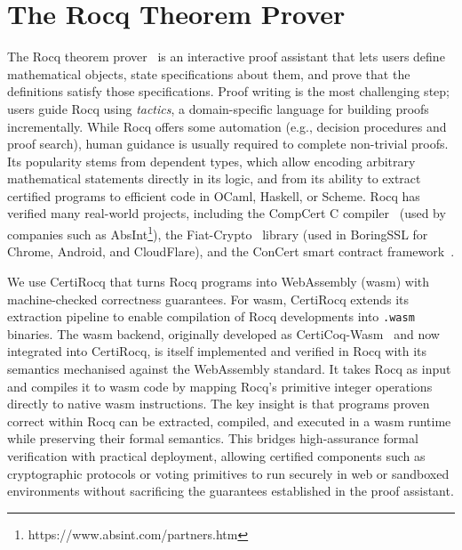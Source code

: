 \section{The Rocq Theorem Prover}\label{coq_theorem}
The Rocq theorem prover~\cite{the_coq_development_team} is an interactive proof assistant that lets users define mathematical objects, state specifications about them, and prove that the definitions satisfy those specifications. Proof writing is the most challenging step; users guide Rocq using \emph{tactics}, a domain-specific language for building proofs incrementally. While Rocq offers some automation (e.g., decision procedures and proof search), human guidance is usually required to complete non-trivial proofs. Its popularity stems from dependent types, which allow encoding arbitrary mathematical statements directly in its logic, and from its ability to extract certified programs to efficient code in OCaml, Haskell, or Scheme.  Rocq has verified many real-world projects, including the CompCert C compiler~\cite{10.1145/1111037.1111042} (used by companies such as AbsInt\footnote{https://www.absint.com/partners.htm}), the Fiat-Crypto~\cite{8835346} library (used in BoringSSL for Chrome, Android, and CloudFlare), and the ConCert smart contract framework~\cite{10.1145/3372885.3373829}.

We use CertiRocq \cite{anand2017certicoq} that turns Rocq programs into WebAssembly (wasm) with machine-checked correctness guarantees. For wasm, CertiRocq extends its extraction pipeline to enable compilation of Rocq developments into \texttt{.wasm} binaries. The wasm backend, originally developed as CertiCoq-Wasm~\cite{meier2025certicoq} and now integrated into CertiRocq, is itself implemented and verified in Rocq with its semantics mechanised against the WebAssembly standard. It takes Rocq as input and compiles it to wasm code by mapping Rocq's primitive integer operations directly to native wasm instructions. The key insight is that programs proven correct within Rocq can be extracted, compiled, and executed in a wasm runtime while preserving their formal semantics. This bridges high-assurance formal verification with practical deployment, allowing certified components such as cryptographic protocols or voting primitives to run securely in web or sandboxed environments without sacrificing the guarantees established in the proof assistant.

